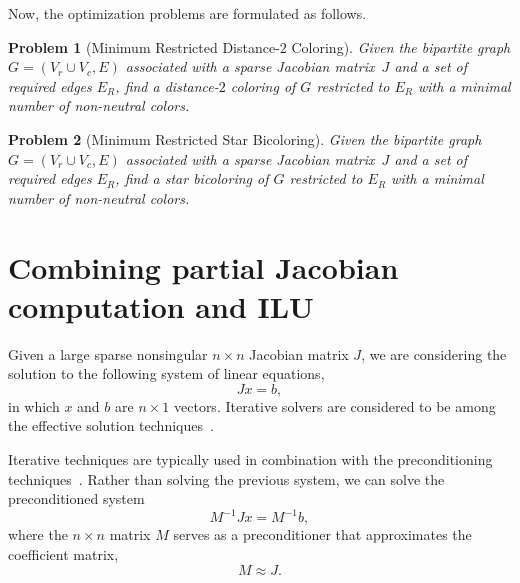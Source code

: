\documentclass[12pt, twoside,a4paper,toc=bibliography]{scrbook}
\newtheorem{problem}{Problem}
\begin{document}
Now, the optimization problems are formulated as follows.

\begin{problem}[Minimum Restricted Distance-$2$ Coloring]
\label{p.restricted.d2} Given the bipartite graph $G=(V_r\cup V_c, E)$
associated with a sparse Jacobian
matrix~$J$ and a set of required edges $E_R$,
find a distance-$2$ coloring of $G$ restricted to $E_R$
with a minimal number of non-neutral colors.
\end{problem}

\begin{problem}[Minimum Restricted Star Bicoloring]
\label{p.restricted.star} Given the bipartite graph $G=(V_r\cup V_c, E)$
associated with a sparse Jacobian
matrix~$J$ and a set of required edges $E_R$,
find a star bicoloring of $G$ restricted to $E_R$
with a minimal number of non-neutral colors.
\end{problem}


\section{Combining partial Jacobian computation and ILU}
\label{s.precond}
Given a large sparse nonsingular $n\times n$ Jacobian matrix $J$,
we are considering the solution to the following system of linear equations,
$$
J x = b,
$$
in which $x$ and $b$ are $n\times 1$ vectors.
Iterative solvers are considered to be among the effective solution techniques~\cite{ilu2003}.

Iterative techniques are typically used in combination with
the preconditioning techniques~\cite{precond1,ilu2003}.
Rather than solving the previous system,
we can solve the preconditioned system
\begin{equation}
\label{e:precond}
M^{-1} J x= M^{-1} b,
\end{equation}
where the $n \times n$ matrix $M$ serves as a preconditioner that approximates
the coefficient matrix,
$$M \approx J.$$
\end{document}
